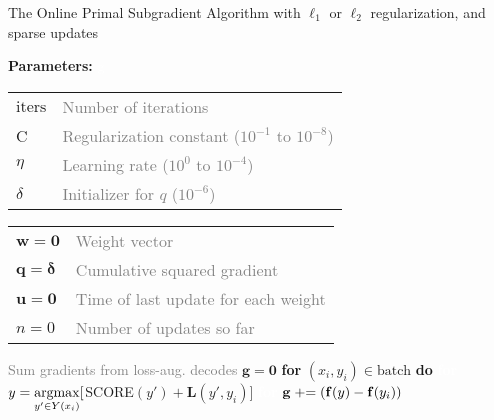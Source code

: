 \begin{algorithm}
\caption{The Online Primal Subgradient Algorithm with $\ell_1$ or $\ell_2$ regularization, and sparse updates}
\label{alg:ops}
\vspace{-5mm}
\setlength\columnsep{-15pt}
\begin{multicols}{2}
\begin{algorithmic}[]
    \State \textbf{Parameters:} \textcolor{white}{g} \\
        \begin{tabular}{ll}
            $\mathrm{iters}$ & \textcolor{gray}{Number of iterations} \\
            C & \textcolor{gray}{Regularization constant ($10^{-1}$ to $10^{-8}$)} \\
            $\eta$ & \textcolor{gray}{Learning rate ($10^0$ to $10^{-4}$)} \\
            $\delta$ & \textcolor{gray}{Initializer for $q$ ($10^{-6}$)} \\[5pt]
        \end{tabular}
    \vspace{1mm}
    \State
    \hspace{-2.5mm}\begin{tabular}{ll}
        $\mathbf{w} = \mathbf{0} $ & \textcolor{gray}{Weight vector} \\
        $\mathbf{q} = \boldsymbol{\delta} $ & \textcolor{gray}{Cumulative squared gradient} \\
        $\mathbf{u} = \mathbf{0} $ & \textcolor{gray}{Time of last update for each weight} \\
        $n = 0$ & \textcolor{gray}{Number of updates so far} \\
    \end{tabular}
            \State \textcolor{gray}{Sum gradients from loss-aug. decodes}
            \State $\mathbf{g} = \mathbf{0}$
            \State \textbf{for} $(x_i,y_i) \in \mathrm{batch}$ \textbf{do}
                \State \textcolor{white}{\textbf{for}} $y = \argmax_{y' \in Y(x_i)} [$SCORE$(y') + \mathbf{L}(y', y_i) ]$
                \State \textcolor{white}{\textbf{for}}  $\mathbf{g} \mathrel{+}= (\mathbf{f}(y) - \mathbf{f}(y_i))$

\end{algorithmic}
\end{multicols}
\end{algorithm}
